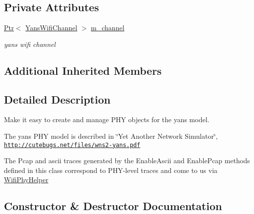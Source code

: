 \subsection*{Private Attributes}
\begin{DoxyCompactItemize}
\item 
\hyperlink{classns3_1_1Ptr}{Ptr}$<$ \hyperlink{classns3_1_1YansWifiChannel}{Yans\+Wifi\+Channel} $>$ \hyperlink{classns3_1_1YansWifiPhyHelper_a365e8788b442b350030328a95df52ad7}{m\+\_\+channel}
\begin{DoxyCompactList}\small\item\em yans wifi channel \end{DoxyCompactList}\end{DoxyCompactItemize}
\subsection*{Additional Inherited Members}


\subsection{Detailed Description}
Make it easy to create and manage P\+HY objects for the yans model. 

The yans P\+HY model is described in \char`\"{}\+Yet Another Network Simulator\char`\"{}, \href{http://cutebugs.net/files/wns2-yans.pdf}{\tt http\+://cutebugs.\+net/files/wns2-\/yans.\+pdf}

The Pcap and ascii traces generated by the Enable\+Ascii and Enable\+Pcap methods defined in this class correspond to P\+H\+Y-\/level traces and come to us via \hyperlink{classns3_1_1WifiPhyHelper}{Wifi\+Phy\+Helper} 

\subsection{Constructor \& Destructor Documentation}
